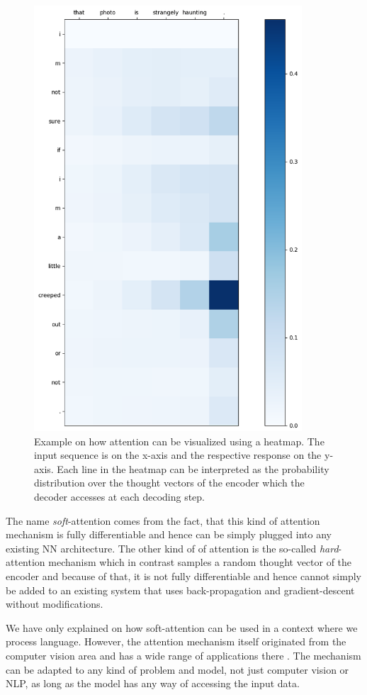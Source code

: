 \begin{figure}[H]
	\centering
	\includegraphics[width=10cm]{img/attention_heatmap_example}
	\caption{Example on how attention can be visualized using a heatmap. The input sequence is on the x-axis and the respective response on the y-axis. Each line in the heatmap can be interpreted as the probability distribution over the thought vectors of the encoder which the decoder accesses at each decoding step.}
	\label{fundamentals:seq2seq:attention_weights_visualization}
\end{figure}

The name \emph{soft}-attention comes from the fact, that this kind of attention mechanism is fully differentiable and hence can be simply plugged into any existing NN architecture. The other kind of of attention is the so-called \emph{hard}-attention mechanism which in contrast samples a random thought vector of the encoder and because of that, it is not fully differentiable and hence cannot simply be added to an existing system that uses back-propagation and gradient-descent without modifications.

We have only explained on how soft-attention can be used in a context where we process language. However, the attention mechanism itself originated from the computer vision area \cite{Desimone:1995}\cite{Itti:1998}\cite{Mnih:2014} and has a wide range of applications there \cite{Gregor:2015}\cite{Xu:2015}\cite{Cho:2015}. The mechanism can be adapted to any kind of problem and model, not just computer vision or NLP, as long as the model has any way of accessing the input data.

